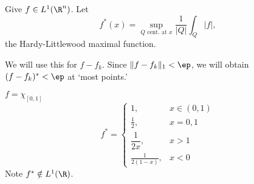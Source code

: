 \begin{dfn}
Give $f \in L^1(\R^n)$. Let 
	\[
	f^*(x)= \sup_{Q \text{ cent. at } x} \dfrac{1}{|Q|} \int_Q |f|,
	\]
the Hardy-Littlewood maximal function.
\end{dfn}


We will use this for $f - f_k$. Since $\| f - f_k \|_1 < \ep$, we will obtain $(f-f_k)^*<\ep$ at `most points.' 

\begin{ex}
$f= \chi_{[0,1]}$
	\[
	f^*= \begin{cases}
	1, & x \in (0,1) \\
	\frac{1}{2}, & x=0,1 \\
	\dfrac{1}{2x}, & x>1 \\
	\frac{1}{2(1-x)}, &  x<0
	\end{cases}
	\]
Note $f^* \notin L^1(\R)$.

\end{ex}





























